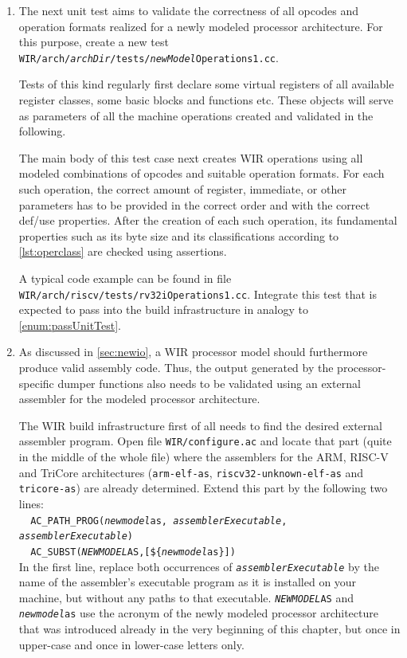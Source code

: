 \begin{enumerate}[resume]
  \item The next unit test aims to validate the correctness of all opcodes and operation formats realized for a newly modeled processor architecture.\label{enum:oper1UnitTest}
  For this purpose, create a new test \texttt{WIR/arch/{\itshape archDir}/tests/{\itshape new\-Model}Operations1.cc}.

  Tests of this kind regularly first declare some virtual registers of all available register classes, some basic blocks and functions etc.
  These objects will serve as parameters of all the machine operations created and validated in the following.

  The main body of this test case next creates \gls{WIR} operations using all modeled combinations of opcodes and suitable operation formats.
  For each such operation, the correct amount of register, immediate, or other parameters has to be provided in the correct order and with the correct def/use properties.
  After the creation of each such operation, its fundamental properties such as its byte size and its classifications according to \cref{lst:operclass} are checked using assertions.

  A typical code example can be found in file \texttt{WIR/arch/riscv/tests/rv32iOperations1.cc}.
  Integrate this test that is expected to pass into the build infrastructure in analogy to \cref{enum:passUnitTest}.

  \item As discussed in \cref{sec:newio}, a \gls{WIR} processor model should furthermore produce valid assembly code.
  Thus, the output generated by the processor-specific dumper functions also needs to be validated using an external assembler for the modeled processor architecture.

  The \gls{WIR} build infrastructure first of all needs to find the desired external assembler program.
  Open file \texttt{WIR/configure.ac} and locate that part (quite in the middle of the whole file) where the assemblers for the ARM, RISC-V and TriCore architectures (\texttt{arm-elf-as}, \texttt{riscv32-unknown-elf-as} and \texttt{tricore-as}) are already determined.
  Extend this part by the following two lines: \\
  \verb|  |\texttt{AC\_PATH\_PROG({\itshape newmodel}as, {\itshape assemblerExecutable}, {\itshape assemblerExecutable})} \\
  \verb|  |\texttt{AC\_SUBST({\itshape NEWMODEL}AS,}\verb|[${|\texttt{\itshape newmodel}\verb|as}])| \\
  In the first line, replace both occurrences of \texttt{\itshape assemblerExecutable} by the name of the assembler's executable program as it is installed on your machine, but without any paths to that executable.
  \texttt{{\itshape NEWMODEL}AS} and \texttt{{\itshape newmodel}as} use the acronym of the newly modeled processor architecture that was introduced already in the very beginning of this chapter, but once in upper-case and once in lower-case letters only.


\end{enumerate}
